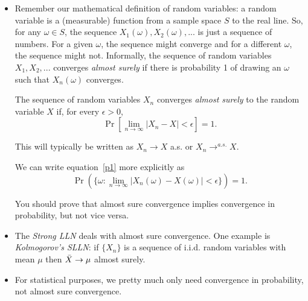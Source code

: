 \begin{itemize}

\item Remember our mathematical definition of random variables: a
  random variable is a (measurable) function from a sample space $S$
  to the real line.  So, for any $\omega \in S$, the sequence $X_1(\omega),
  X_2(\omega),...$ is just a sequence of numbers.  For a given $\omega$, the
  sequence might converge and for a different $\omega$, the sequence might
  not.  Informally, the sequence of random variables $X_1,X_2,...$
  converges \emph{almost surely} if there is probability 1 of drawing
  an $\omega$ such that $X_n(\omega)$ converges.
  \begin{defn}
    The sequence of random variables $X_n$ converges \emph{almost
    surely} to the random variable $X$ if, for every $\epsilon > 0$,
    \begin{equation}\label{p1}
      \Pr[\lim_{n \to \infty} | X_n - X | < \epsilon] = 1.
    \end{equation}
  \end{defn}
  This will typically be written as $X_n \to X$ a.s. or $X_n \to^{a.s.}
  X$.

  We can write equation~\eqref{p1} more explicitly as
  \begin{equation*}
    \Pr(\{ \omega : \lim_{n \to \infty} | X_n(\omega) - X(\omega) |
           < \epsilon \}) = 1.
  \end{equation*}

  You should prove that almost sure convergence implies convergence in
  probability, but not vice versa.

\item The \emph{Strong LLN} deals with almost sure convergence.  One
  example is \emph{Kolmogorov's SLLN}: if $\{X_n\}$ is a sequence of
  i.i.d. random variables with mean $\mu$ then $\bar{X} \to \mu$ almost surely.

\item For statistical purposes, we pretty much only need convergence
  in probability, not almost sure convergence.

\end{itemize}


